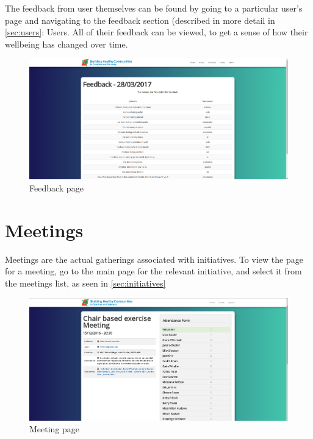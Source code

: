 \documentclass{bhcguides}
\begin{document}
The feedback from user themselves can be found by going to a particular user's page and navigating to the feedback section (described in more detail in \autoref{sec:users}: Users. All of their feedback can be viewed, to get a sense of how their wellbeing has changed over time.

\begin{figure}[h]
 \centerline{\includegraphics[width=\textwidth, height=\textheight, keepaspectratio]{feedbackpage.png}}
 \caption{Feedback page}
 \label{fig:feedbackPage}
\end{figure}

\pagebreak

\section{Meetings}
\label{sec:meetings}

Meetings are the actual gatherings associated with initiatives. To view the page for a meeting, go to the main page for the relevant initiative, and select it from the meetings list, as seen in \autoref{sec:initiatives}

\begin{figure}[h]
 \centerline{\includegraphics[width=\textwidth, height=\textheight, keepaspectratio]{meetingpage.png}}
 \caption{Meeting page}
 \label{fig:meetingPage}
\end{figure}
\end{document}
